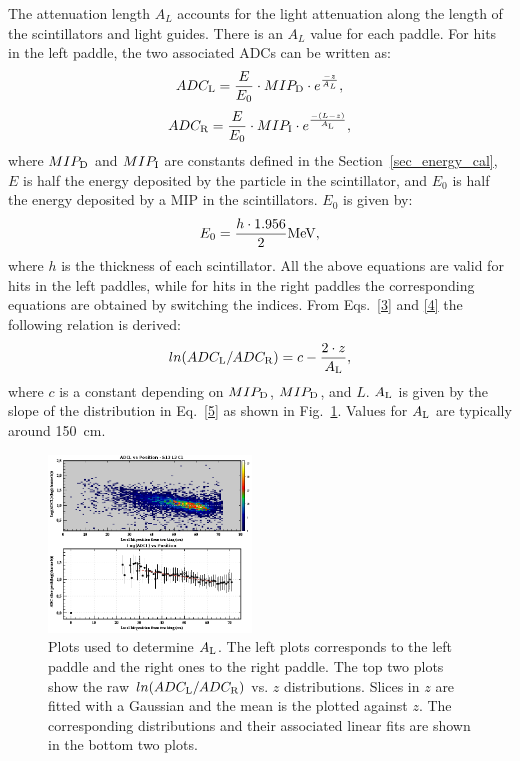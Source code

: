 The attenuation length $A_{L}$ accounts for the light attenuation along the length of the scintillators and light guides. There is an $A_{L}$ value for each paddle.
%
For hits in the left paddle, the two associated ADCs can be written as:
\begin{equation}
\label{3}
ADC_{\rm{L}}=\frac{E}{E_0}\cdot MIP_{\rm{D}}\cdot e^{\frac{-z}{A_{L}}},
\end{equation}
\begin{equation}
\label{4}
ADC_{\rm{R}}=\frac{E}{E_0}\cdot MIP_{\rm{I}}\cdot e^{\frac{-(L-z)}{A_{\rm{L}}}},
\end{equation}
where $MIP_{\rm{D}}$ and $MIP_{\rm{I}}$ are constants defined in the Section~\ref{sec_energy_cal}, $E$ is half the energy deposited by the particle in the scintillator, and $E_0$ is half the energy deposited by a MIP in the scintillators.
$E_0$ is given by:
\begin{equation}\label{eq_def_e0}
E_0=\frac{h\cdot 1.956}{2} \rm{MeV},
\end{equation}
where $h$ is the thickness of each scintillator.
All the above equations are valid for hits in the left paddles, while for hits in the right paddles the corresponding equations are obtained by switching the indices.
From Eqs.~\ref{3} and \ref{4} the following relation is derived:
\begin{equation}
\label{5}
ln(ADC_{\rm{L}}/ADC_{\rm{R}})=c-\frac{2\cdot z}{A_{\rm{L}}},
\end{equation}
where $c$ is a constant depending on $MIP_{\rm{D}}$, $MIP_{\rm{D}}$, and $L$. $A_{\rm{L}}$ is given by the slope of the distribution in Eq.~\ref{5} as shown in Fig.~\ref{attl}. Values for $A_{\rm{L}}$ are typically around 150~cm.

\begin{figure}[htb]
\begin{center}
\includegraphics[width=0.48\textwidth]{Figure/attl1.png} 
\end{center}
\caption{Plots used to determine $A_{\rm{L}}$. The left plots corresponds to the left paddle and the right ones to the right paddle. The top two plots show the raw $ln(ADC_{\rm{L}}/ADC_{\rm{R}})$ vs. $z$ distributions. Slices in $z$ are fitted with a Gaussian and the mean is the plotted against $z$. The corresponding distributions and their associated linear fits are shown in the bottom two plots.}
\label{attl}
\end{figure}

